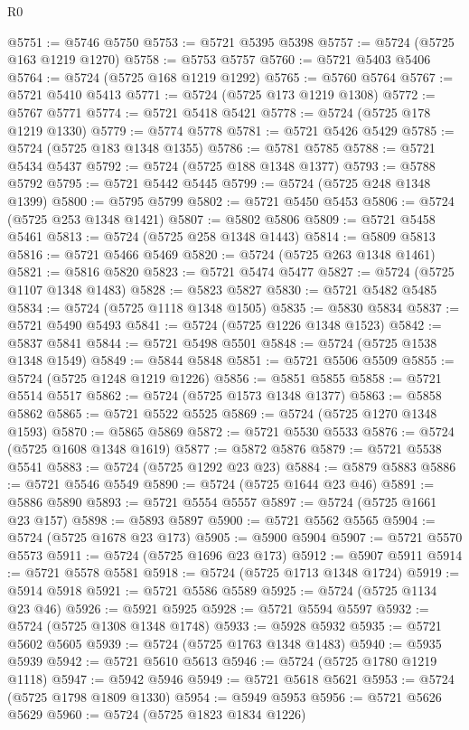\begin{lexlean}{R0}
\begin{coremodule}
@5751 := @5746 @5750
@5753 := @5721 @5395 @5398
@5757 := @5724 (@5725 @163 @1219 @1270)
@5758 := @5753 @5757
@5760 := @5721 @5403 @5406
@5764 := @5724 (@5725 @168 @1219 @1292)
@5765 := @5760 @5764
@5767 := @5721 @5410 @5413
@5771 := @5724 (@5725 @173 @1219 @1308)
@5772 := @5767 @5771
@5774 := @5721 @5418 @5421
@5778 := @5724 (@5725 @178 @1219 @1330)
@5779 := @5774 @5778
@5781 := @5721 @5426 @5429
@5785 := @5724 (@5725 @183 @1348 @1355)
@5786 := @5781 @5785
@5788 := @5721 @5434 @5437
@5792 := @5724 (@5725 @188 @1348 @1377)
@5793 := @5788 @5792
@5795 := @5721 @5442 @5445
@5799 := @5724 (@5725 @248 @1348 @1399)
@5800 := @5795 @5799
@5802 := @5721 @5450 @5453
@5806 := @5724 (@5725 @253 @1348 @1421)
@5807 := @5802 @5806
@5809 := @5721 @5458 @5461
@5813 := @5724 (@5725 @258 @1348 @1443)
@5814 := @5809 @5813
@5816 := @5721 @5466 @5469
@5820 := @5724 (@5725 @263 @1348 @1461)
@5821 := @5816 @5820
@5823 := @5721 @5474 @5477
@5827 := @5724 (@5725 @1107 @1348 @1483)
@5828 := @5823 @5827
@5830 := @5721 @5482 @5485
@5834 := @5724 (@5725 @1118 @1348 @1505)
@5835 := @5830 @5834
@5837 := @5721 @5490 @5493
@5841 := @5724 (@5725 @1226 @1348 @1523)
@5842 := @5837 @5841
@5844 := @5721 @5498 @5501
@5848 := @5724 (@5725 @1538 @1348 @1549)
@5849 := @5844 @5848
@5851 := @5721 @5506 @5509
@5855 := @5724 (@5725 @1248 @1219 @1226)
@5856 := @5851 @5855
@5858 := @5721 @5514 @5517
@5862 := @5724 (@5725 @1573 @1348 @1377)
@5863 := @5858 @5862
@5865 := @5721 @5522 @5525
@5869 := @5724 (@5725 @1270 @1348 @1593)
@5870 := @5865 @5869
@5872 := @5721 @5530 @5533
@5876 := @5724 (@5725 @1608 @1348 @1619)
@5877 := @5872 @5876
@5879 := @5721 @5538 @5541
@5883 := @5724 (@5725 @1292 @23 @23)
@5884 := @5879 @5883
@5886 := @5721 @5546 @5549
@5890 := @5724 (@5725 @1644 @23 @46)
@5891 := @5886 @5890
@5893 := @5721 @5554 @5557
@5897 := @5724 (@5725 @1661 @23 @157)
@5898 := @5893 @5897
@5900 := @5721 @5562 @5565
@5904 := @5724 (@5725 @1678 @23 @173)
@5905 := @5900 @5904
@5907 := @5721 @5570 @5573
@5911 := @5724 (@5725 @1696 @23 @173)
@5912 := @5907 @5911
@5914 := @5721 @5578 @5581
@5918 := @5724 (@5725 @1713 @1348 @1724)
@5919 := @5914 @5918
@5921 := @5721 @5586 @5589
@5925 := @5724 (@5725 @1134 @23 @46)
@5926 := @5921 @5925
@5928 := @5721 @5594 @5597
@5932 := @5724 (@5725 @1308 @1348 @1748)
@5933 := @5928 @5932
@5935 := @5721 @5602 @5605
@5939 := @5724 (@5725 @1763 @1348 @1483)
@5940 := @5935 @5939
@5942 := @5721 @5610 @5613
@5946 := @5724 (@5725 @1780 @1219 @1118)
@5947 := @5942 @5946
@5949 := @5721 @5618 @5621
@5953 := @5724 (@5725 @1798 @1809 @1330)
@5954 := @5949 @5953
@5956 := @5721 @5626 @5629
@5960 := @5724 (@5725 @1823 @1834 @1226)

\end{coremodule}
\end{lexlean}
